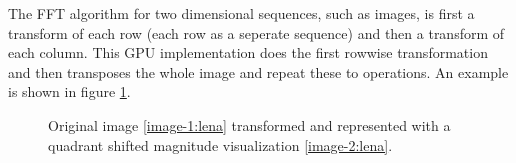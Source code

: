 The FFT algorithm for two dimensional sequences, such as images, is first a transform of each row (each row as a seperate sequence) and then a transform of each column. This GPU implementation does the first rowwise transformation and then transposes the whole image and repeat these to operations. An example is shown in figure \ref{fig:twodimentransform}.
\begin{figure}
	\centering
    \hfill
	\caption{Original image \ref{image-1:lena} transformed and represented with a quadrant shifted magnitude visualization \ref{image-2:lena}. }
    \label{fig:twodimentransform}
\end{figure}